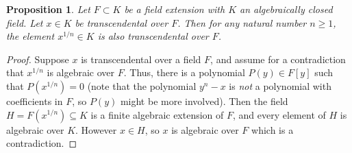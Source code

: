 \documentclass[12pt]{article}
\newtheorem{prop}{Proposition}
\begin{document}
\begin{prop}
Let $F\subset K$ be a field extension with $K$ an algebraically closed field. Let $x\in K$ be transcendental over $F$. Then for any natural number $n\geq 1$, the element $x^{1/n}\in K$ is also transcendental over $F$. 
\end{prop}
\begin{proof}
Suppose $x$ is transcendental over a field $F$, and assume for a contradiction that $x^{1/n}$ is algebraic over $F$. Thus, there is a polynomial $P(y)\in F[y]$ such that $P(x^{1/n})=0$ (note that the polynomial $y^n-x$ is {\it not} a polynomial with coefficients in $F$, so $P(y)$ might be more involved). Then the field $H=F(x^{1/n})\subseteq K$ is a finite algebraic extension of $F$, and every element of $H$ is algebraic over $K$. However $x\in H$, so $x$ is algebraic over $F$ which is a contradiction.
\end{proof}
\end{document}
